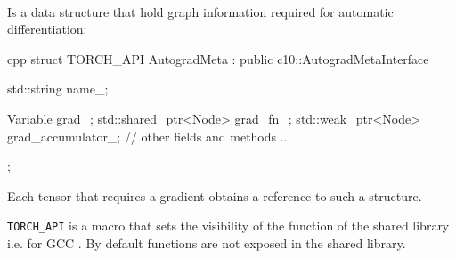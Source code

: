 \begin{defnbox}\nospacing
    \begin{defn}\label{defn:autogradmeta}\leavevmode\\
        Is a data structure that hold graph information required for automatic differentiation:
        \begin{mintlinebox}{cpp}
            struct TORCH_API AutogradMeta : public c10::AutogradMetaInterface {
                std::string name_;

                Variable grad_;
                std::shared_ptr<Node> grad_fn_;
                std::weak_ptr<Node> grad_accumulator_;
                // other fields and methods
                ...
            };
        \end{mintlinebox}
    \end{defn}
\end{defnbox}
\begin{notebox}[Note]\nospacing
    \begin{itemizenosep}
        \item Each tensor that requires a gradient obtains a reference to such a structure.
        \item \texttt{TORCH\_API} is a macro that sets the visibility of the function of the shared library i.e.
        for GCC .
        By default functions are not exposed in the shared library.
    \end{itemizenosep}
\end{notebox}

